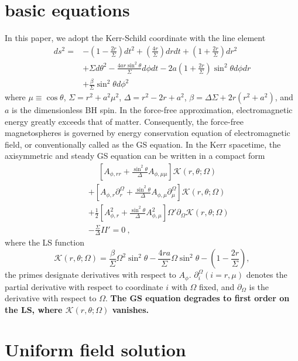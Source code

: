 \documentclass[aps,prd,reprint,nofootinbib, superscriptaddress]{revtex4-1}
\def\nn{\nonumber}
\def\ct{\cos\theta}
\def\sst{\sin^2\theta}
\def\Ar{A_{\phi,r}}
\def\Arr{A_{\phi,rr}}
\def\Am{A_{\phi,\mu}}
\def\Amm{A_{\phi,\mu\mu}}
\def\be{\begin{equation}}
\def\ee{\end{equation}}
\def\ben{\begin{eqnarray}}
\def\een{\end{eqnarray}}
\begin{document}
\section{basic equations}
\label{sec:basic}
In this paper, we adopt the Kerr-Schild
coordinate with the line element
\[
\begin{aligned}
ds^2 =
&-\left( 1-\frac{2r}{\Sigma} \right)dt^2 + \left( \frac{4
r}{\Sigma} \right) dr dt + \left(1+\frac{2r}{\Sigma} \right) dr^2 \\
&+ \Sigma d\theta^2 - \frac{4 a r \sin^2\theta}{\Sigma} d\phi dt
- 2 a \left(1+\frac{2r}{\Sigma}\right) \sin^2\theta d\phi dr     \\
& + \frac{\beta}{\Sigma} \sst d\phi^2
\end{aligned}
\]
where $\mu\equiv\ct$, $\Sigma = r^2 + a^2 \mu^2$, $\Delta = r^2 -2r + a^2$,
$\beta = \Delta\Sigma + 2r(r^2 + a^2)$, and $a$ is the dimensionless BH spin.
In the force-free approximation, electromagnetic energy greatly exceeds that of matter.
Consequently, the force-free magnetospheres is governed by energy
conservation equation of electromagnetic field, or
conventionally called as the GS equation.
In the Kerr spacetime,
the axisymmetric and steady GS equation can be written in a compact form \cite{Pan2017}
\ben
\label{eq:GSg}
&&\phantom{+}
 \left[\Arr + \frac{\sst}{\Delta}\Amm \right]  \mathcal K(r,\theta; \Omega )\nn \\
&&
+\left[\Ar \partial_r^\Omega  +  \frac{\sst}{\Delta}\Am \partial_\mu^\Omega\right] \mathcal K(r,\theta; \Omega ) \nn \\
&&
+ \frac{1}{2}\left[\Ar^2 + \frac{\sst}{\Delta}\Am^2\right]  \Omega' \partial_\Omega \mathcal K(r,\theta; \Omega )\nn \\
&&
- \frac{\Sigma}{\Delta}II' = 0 \ ,
\een
where the LS function
\be
\label{eq:ls}
\mathcal K(r,\theta; \Omega )= \frac{\beta}{\Sigma}\Omega^2 \sst
-\frac{4ra}{\Sigma}\Omega \sst
-\left(1-\frac{2r}{\Sigma}\right),
\ee
the primes designate  derivatives with respect to $A_\phi$.
$\partial_i^\Omega (i=r, \mu)$  denotes the partial derivative
with respect to coordinate $i$ with $\Omega$ fixed, and $\partial_\Omega$ is the derivative with
respect to $\Omega$. {\bf The GS equation degrades to first order on the LS, where $\mathcal K(r,\theta; \Omega )$ vanishes.}

\section{Uniform field solution}
\label{sec:uni_sol}
\end{document}

